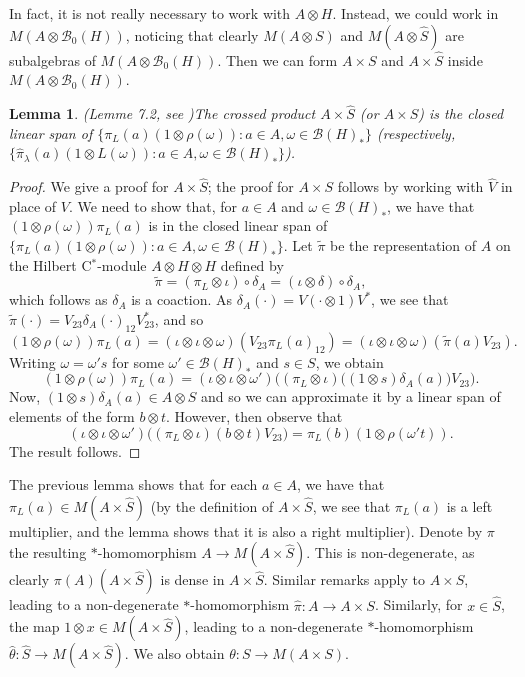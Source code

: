 \documentclass[a4paper,12pt]{article}
\theoremstyle{plain}
\newtheorem{lemma}[proposition]{Lemma}
\theoremstyle{definition}
\newcommand{\mc}{\mathcal}
\begin{document}
In fact, it is not really necessary to work with $A\otimes H$.  Instead,
we could work in $M(A\otimes\mc B_0(H))$, noticing that clearly
$M(A\otimes S)$ and $M(A\otimes \hat S)$ are subalgebras of 
$M(A\otimes\mc B_0(H))$.  Then we can form $A\times S$ and $A\times\hat S$
inside $M(A\otimes\mc B_0(H))$.

\begin{lemma}(Lemme 7.2, see \cite{r23})\label{lem:4}
The crossed product $A\times\hat S$ (or $A\times S$) is the closed linear
span of $\{ \pi_L(a)(1\otimes \rho(\omega)) : a\in A, \omega\in\mc B(H)_*\}$
(respectively, $\{ \hat\pi_\lambda(a)(1\otimes L(\omega)) : a\in A,
\omega\in\mc B(H)_*\}$).
\end{lemma}
\begin{proof}
We give a proof for $A\times\hat S$; the proof for $A\times S$ follows by
working with $\hat V$ in place of $V$.  We need to show that, for $a\in A$ and
$\omega\in\mc B(H)_*$, we have that $(1\otimes\rho(\omega))\pi_L(a)$
is in the closed linear span of
$\{ \pi_L(a)(1\otimes \rho(\omega)) : a\in A, \omega\in\mc B(H)_*\}$.
Let $\tilde\pi$ be the representation of $A$ on the Hilbert C$^*$-module
$A\otimes H\otimes H$ defined by
\[ \tilde\pi = (\pi_L\otimes\iota)\circ\delta_A
= (\iota\otimes\delta)\circ\delta_A, \]
which follows as $\delta_A$ is a coaction.  As $\delta_A(\cdot)
= V(\cdot\otimes 1)V^*$, we see that $\tilde\pi(\cdot) =
V_{23}\delta_A(\cdot)_{12}V_{23}^*$, and so
\[ (1\otimes\rho(\omega))\pi_L(a) = (\iota\otimes\iota\otimes\omega)
(V_{23}\pi_L(a)_{12})
= (\iota\otimes\iota\otimes\omega)(\tilde\pi(a)V_{23}). \]
Writing $\omega = \omega' s$ for some $\omega'\in\mc B(H)_*$ and $s\in S$,
we obtain
\[ (1\otimes\rho(\omega))\pi_L(a) =
(\iota\otimes\iota\otimes\omega')\big((\pi_L\otimes\iota)
\big( (1\otimes s)\delta_A(a)\big) V_{23}\big). \]
Now, $(1\otimes s)\delta_A(a) \in A\otimes S$ and so we can approximate
it by a linear span of elements of the form $b\otimes t$.  However, then
observe that
\[ (\iota\otimes\iota\otimes\omega')\big((\pi_L\otimes\iota)
(b\otimes t) V_{23}\big) = \pi_L(b) (1\otimes\rho(\omega' t)). \]
The result follows.
\end{proof}

The previous lemma shows that for each $a\in A$, we have that $\pi_L(a)
\in M(A\times\hat S)$ (by the definition of $A\times\hat S$, we see that
$\pi_L(a)$ is a left multiplier, and the lemma shows that it is also a right
multiplier).  Denote by $\pi$ the resulting $*$-homomorphism $A\rightarrow
M(A\times\hat S)$.  This is non-degenerate, as clearly $\pi(A)(A\times\hat S)$
is dense in $A\times\hat S$.  Similar remarks apply to $A\times S$, leading
to a non-degenerate $*$-homomorphism $\hat\pi:A\rightarrow A\times S$.
Similarly, for $x\in\hat S$, the map $1\otimes x \in M(A\times\hat S)$,
leading to a non-degenerate $*$-homomorphism $\hat\theta:\hat S\rightarrow
M(A\times\hat S)$.  We also obtain $\theta:S\rightarrow M(A\times S)$.
\end{document}
